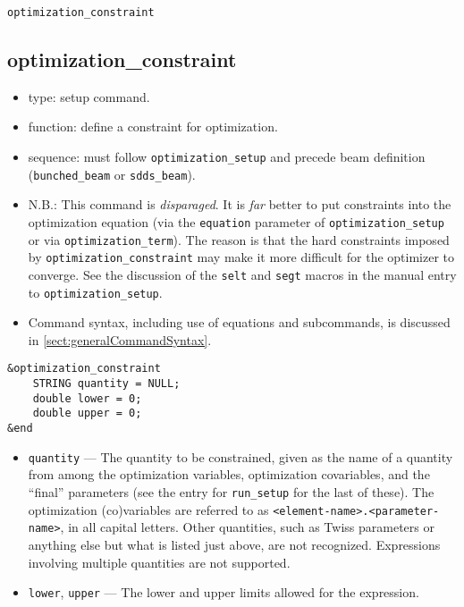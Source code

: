 \documentclass[11pt]{article}
\begin{document}
\newpage
\begin{center}{\Large\verb|optimization_constraint|}\end{center}
\subsection{optimization\_constraint \label{subsec:optimizationconstraint}}

\begin{itemize}
\item type: setup command.
\item function: define a constraint for optimization.
\item sequence: must follow \verb|optimization_setup| and precede beam definition (\verb|bunched_beam| or \verb|sdds_beam|).
\item N.B.: This command is {\em disparaged}. It is {\em far} better to put constraints
	into the optimization equation (via the \verb|equation| parameter of
	\verb|optimization_setup| or via \verb|optimization_term|).  The reason
	is that the hard constraints imposed by \verb|optimization_constraint|
	may make it more difficult for the optimizer to converge.  See the discussion of the
        \verb|selt| and \verb|segt| macros in the manual entry to \verb|optimization_setup|.
\item Command syntax, including use of equations and subcommands, is discussed in \ref{sect:generalCommandSyntax}.
\end{itemize}

\begin{verbatim}
&optimization_constraint
    STRING quantity = NULL;
    double lower = 0;
    double upper = 0;
&end
\end{verbatim}

\begin{itemize}

\item \verb|quantity| --- The quantity to be constrained, given as the
name of a quantity from among the optimization variables, optimization
covariables, and the ``final'' parameters (see the entry for
\verb|run_setup| for the last of these).  The optimization
(co)variables are referred to as
\verb|<element-name>.<parameter-name>|, in all capital letters.  Other
quantities, such as Twiss parameters or anything else but what is
listed just above, are not recognized.  Expressions involving multiple
quantities are not supported.

\item \verb|lower|, \verb|upper| --- The lower and upper limits
allowed for the expression.

\end{itemize}
\end{document}

